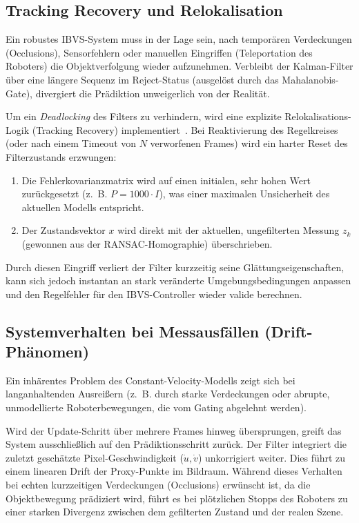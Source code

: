 \documentclass{article}
\begin{document}
\subsection{Tracking Recovery und Relokalisation}
Ein robustes IBVS-System muss in der Lage sein, nach temporären Verdeckungen (Occlusions), Sensorfehlern oder manuellen Eingriffen (Teleportation des Roboters) die Objektverfolgung wieder aufzunehmen. Verbleibt der Kalman-Filter über eine längere Sequenz im Reject-Status (ausgelöst durch das Mahalanobis-Gate), divergiert die Prädiktion unweigerlich von der Realität.

Um ein \textit{Deadlocking} des Filters zu verhindern, wird eine explizite Relokalisations-Logik (Tracking Recovery) implementiert~\cite{williams2007real}. Bei Reaktivierung des Regelkreises (oder nach einem Timeout von $N$ verworfenen Frames) wird ein harter Reset des Filterzustands erzwungen:
\begin{enumerate}
    \item Die Fehlerkovarianzmatrix wird auf einen initialen, sehr hohen Wert zurückgesetzt (z.~B. $P = 1000 \cdot I$), was einer maximalen Unsicherheit des aktuellen Modells entspricht.
    \item Der Zustandsvektor $x$ wird direkt mit der aktuellen, ungefilterten Messung $z_k$ (gewonnen aus der RANSAC-Homographie) überschrieben.
\end{enumerate}
Durch diesen Eingriff verliert der Filter kurzzeitig seine Glättungseigenschaften, kann sich jedoch instantan an stark veränderte Umgebungsbedingungen anpassen und den Regelfehler für den IBVS-Controller wieder valide berechnen.




\subsection{Systemverhalten bei Messausfällen (Drift-Phänomen)}
Ein inhärentes Problem des Constant-Velocity-Modells zeigt sich bei langanhaltenden Ausreißern (z.~B. durch starke Verdeckungen oder abrupte, unmodellierte Roboterbewegungen, die vom Gating abgelehnt werden). 

Wird der Update-Schritt über mehrere Frames hinweg übersprungen, greift das System ausschließlich auf den Prädiktionsschritt zurück. Der Filter integriert die zuletzt geschätzte Pixel-Geschwindigkeit ($\dot{u}, \dot{v}$) unkorrigiert weiter. Dies führt zu einem linearen Drift der Proxy-Punkte im Bildraum. Während dieses Verhalten bei echten kurzzeitigen Verdeckungen (Occlusions) erwünscht ist, da die Objektbewegung prädiziert wird, führt es bei plötzlichen Stopps des Roboters zu einer starken Divergenz zwischen dem gefilterten Zustand und der realen Szene.
\end{document}
